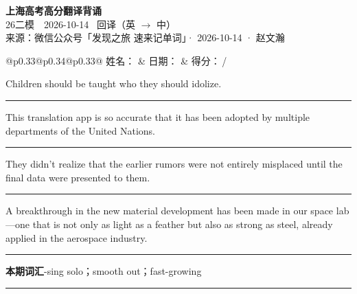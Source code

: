 \documentclass[11pt,a4paper]{article}
\newcommand{\num}[1]{\makebox[1.9em][r]{#1.}\hspace{0.3em}}
\newcommand{\wline}{\noindent\rule{\linewidth}{0.4pt}}
\begin{document}
\pagestyle{plain}
\begin{center}
{\LARGE\bfseries 上海高考高分翻译背诵 }\\[0.25em]
{\large 26二模　2026-10-14 \quad\ 回译（英 $\to$ 中）}\\[0.35em]
{\footnotesize 来源：微信公众号「发现之旅 速来记单词」· 2026-10-14 · 赵文瀚}
\end{center}

\vspace{0.4em}
\noindent\begin{tabular}{@{}p{0.33\textwidth}@{}p{0.34\textwidth}@{}p{0.33\textwidth}@{}}
姓名：\underline{\hspace{2.0cm}} & 日期：\underline{\hspace{2.0cm}} & 得分：\underline{\hspace{1.4cm}}\,/ \\
\end{tabular}

\vspace{0.5em}

\vspace{0.8em}
\num{1}Children should be taught who they should idolize.

\vspace{0.25em}

\wline

\num{2}This translation app is so accurate that it has been adopted by multiple departments of the United Nations.

\vspace{0.25em}

\wline

\num{3}They didn’t realize that the earlier rumors were not entirely misplaced until the final data were presented to them.

\vspace{0.25em}

\wline

\num{4}A breakthrough in the new material development has been made in our space lab—one that is not only as light as a feather but also as strong as steel, already applied in the aerospace industry.

\vspace{0.25em}

\wline

\vspace{0.4em}\noindent{\color{rulegray}\rule{\textwidth}{0.6pt}}\vspace{0.4em}

\num{5}\textbf{本期词汇}\quad -sing solo；smooth out；fast-growing

\vspace{0.25em}

\wline
\end{document}
